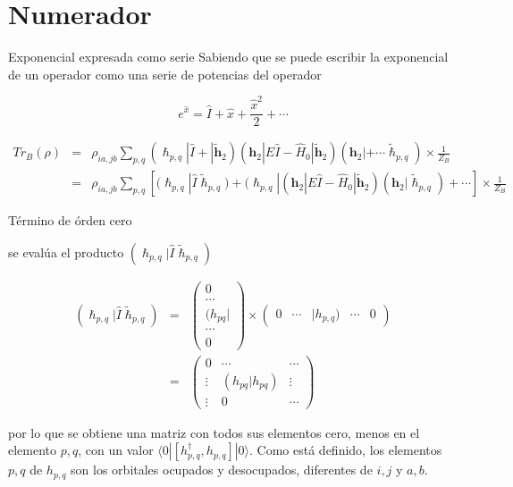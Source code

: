 \documentclass{beamer}
\begin{document}
\section{Numerador}
\begin{frame}{Exponencial expresada como serie}
Sabiendo que se puede escribir la exponencial de un operador como una serie de potencias del operador


\begin{equation*}\label{exp_rho}
	e^{\hat{x}} = \hat{I} + \hat{x} + \frac{\hat{x}^2}{2} + \cdots
\end{equation*}

\pause

\begin{eqnarray*}\label{serie_rho}
	Tr_B (\rho) &=&  \rho_{ia,jb}  \sum_{p,q} ( \bm{\hslash}_{p,q} | \hat{I} +  | \bm{\widetilde{h}}_2 ) (\bm{h}_2| E \hat{I} - \hat{H}_0 |
	 \bm{\widetilde{h}}_2 )   (\bm{h}_2|  + \cdots  \widetilde{\bm{\hslash}}_{p,q} ) \times \frac{1}{Z_B} \\
	 &=& \rho_{ia,jb} \sum_{p,q} \left[ ( \bm{\hslash}_{p,q} |  \hat{I} \widetilde{\bm{\hslash}}_{p,q} ) 
	  + ( \bm{\hslash}_{p,q} | (\bm{h}_2| E \hat{I} - \hat{H}_0 |
	 \bm{\widetilde{h}}_2 )   (\bm{h}_2| \widetilde{\bm{\hslash}}_{p,q} ) + \cdots \right]  \times \frac{1}{Z_B}
\end{eqnarray*}

\end{frame}
\small
\begin{frame}{Término de órden cero}
  
  se evalúa el producto $( \bm{\hslash}_{p,q} |\hat{I} \bm{\widetilde{\hslash}}_{p,q} )$


\begin{eqnarray*}
	( \bm{\hslash}_{p,q} |\hat{I} \bm{\widetilde{\hslash}}_{p,q} ) &=& 
	\begin{pmatrix}
		0 \\\cdots\\
		(h_{pq}| \\
		\cdots \\
		0 \end{pmatrix}
 \times \begin{pmatrix}
	0 & \cdots & |h_{p,q})& \cdots& 0
\end{pmatrix} \\
	&=& \begin{pmatrix}
		0 & \cdots &  \cdots  \\
		\vdots & (h_{pq} | h_{pq}) & \vdots \\
		\vdots & 0 & \cdots
		\end{pmatrix}
\end{eqnarray*}

por lo que se obtiene una matriz con todos sus elementos cero, menos en el elemento $p,q$, 
con un valor $\langle0| [h^\dagger_{p,q}, h_{p,q}] |0\rangle$. 
Como está definido, los elementos $p,q$ de $h_{p,q}$ son los orbitales ocupados y desocupados, 
diferentes de $i,j$ y $a,b$.
\end{frame}
\end{document}

